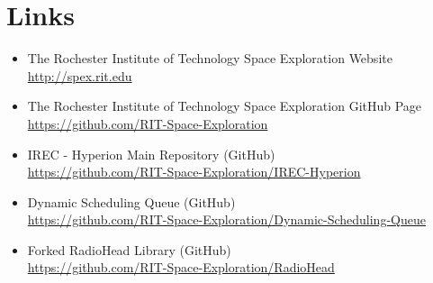 \documentclass[11pt]{article}
\begin{document}
\section{Links}
\begin{itemize}
	\item The Rochester Institute of Technology Space Exploration Website
	\\ \url{http://spex.rit.edu}
	\item The Rochester Institute of Technology Space Exploration GitHub Page \url{https://github.com/RIT-Space-Exploration}
	\item IREC - Hyperion Main Repository (GitHub)
	\\ \url{https://github.com/RIT-Space-Exploration/IREC-Hyperion}
	\item Dynamic Scheduling Queue (GitHub)
	\\ \url{https://github.com/RIT-Space-Exploration/Dynamic-Scheduling-Queue}
	\item Forked RadioHead Library (GitHub)
	\\ \url{https://github.com/RIT-Space-Exploration/RadioHead}
\end{itemize}
\end{document}
